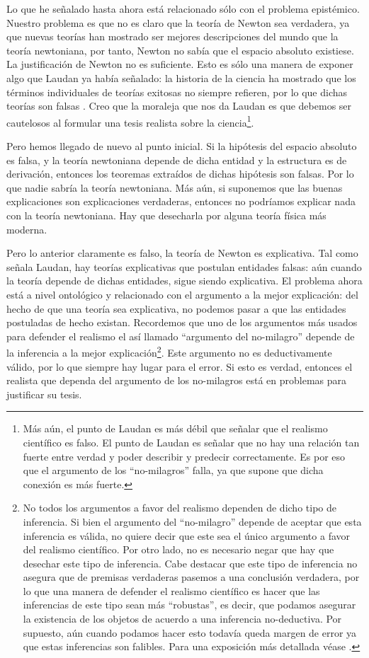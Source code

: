 Lo que he señalado hasta ahora está relacionado sólo con el problema epistémico. Nuestro problema es que no es claro que la teoría de Newton sea verdadera, ya que nuevas teorías han mostrado ser mejores descripciones del mundo que la teoría newtoniana, por tanto, Newton no sabía que el espacio absoluto existiese. La justificación de Newton no es suficiente. Esto es sólo una manera de exponer algo que Laudan ya había señalado: la historia de la ciencia ha mostrado que los términos individuales de teorías exitosas no siempre refieren, por lo que dichas teorías son falsas \cite{laudan1981}. Creo que la moraleja que nos da Laudan es que debemos ser cautelosos al formular una tesis realista sobre la ciencia\footnote{Más aún, el punto de Laudan es más débil que señalar que el realismo científico es falso. El punto de Laudan es señalar que no hay una relación tan fuerte entre verdad y poder describir y predecir correctamente. Es por eso que el argumento de los ``no-milagros'' falla, ya que supone que dicha conexión es más fuerte.}.

Pero hemos llegado de nuevo al punto inicial. Si la hipótesis del espacio absoluto es falsa, y la teoría newtoniana depende de dicha entidad y la estructura es de derivación, entonces los teoremas extraídos de dichas hipótesis son falsas. Por lo que nadie sabría la teoría newtoniana. Más aún, si suponemos que las buenas explicaciones son explicaciones verdaderas, entonces no podríamos explicar nada con la teoría newtoniana. Hay que desecharla por alguna teoría física más moderna.

Pero lo anterior claramente es falso, la teoría de Newton es explicativa. Tal como señala Laudan, hay teorías explicativas que postulan entidades falsas: aún cuando la teoría depende de dichas entidades, sigue siendo explicativa. El problema ahora está a nivel ontológico y relacionado con el argumento a la mejor explicación: del hecho de que una teoría sea explicativa, no podemos pasar a que las entidades postuladas de hecho existan. Recordemos que uno de los argumentos más usados para defender el realismo el así llamado ``argumento del no-milagro'' depende de la inferencia a la mejor explicación\footnote{No todos los argumentos a favor del realismo dependen de dicho tipo de inferencia. Si bien el argumento del ``no-milagro'' depende de aceptar que esta inferencia es válida, no quiere decir que este sea el único argumento a favor del realismo científico. Por otro lado, no es necesario negar que hay que desechar este tipo de inferencia. Cabe destacar que este tipo de inferencia no asegura que de premisas verdaderas pasemos a una conclusión verdadera, por lo que una manera de defender el realismo científico es hacer que las inferencias de este tipo sean más ``robustas'', es decir, que podamos asegurar la existencia de los objetos de acuerdo a una inferencia no-deductiva. Por supuesto, aún cuando podamos hacer esto todavía queda margen de error ya que estas inferencias son falibles. Para una exposición más detallada véase \cite{saatsi2010}.}. Este argumento no es deductivamente válido, por lo que siempre hay lugar para el error. Si esto es verdad, entonces el realista que dependa del argumento de los no-milagros está en problemas para justificar su tesis.

